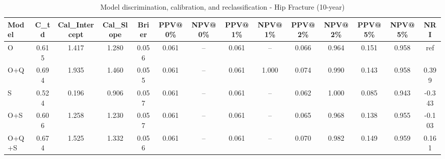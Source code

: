 \begin{table}[htbp]
\centering
\small
\caption{Model discrimination, calibration, and reclassification - Hip Fracture (10-year)}
\label{tab:perf_pd_10y}
\begin{tabular}{lccccccccccccc}
\toprule
Model & C\_td & Cal\_Intercept & Cal\_Slope & Brier & PPV@0\% & NPV@0\% & PPV@1\% & NPV@1\% & PPV@2\% & NPV@2\% & PPV@5\% & NPV@5\% & NRI \\
\midrule
O & 0.615 & 1.417 & 1.280 & 0.056 & 0.061 & -- & 0.061 & -- & 0.066 & 0.964 & 0.151 & 0.958 & ref \\
O+Q & 0.694 & 1.935 & 1.460 & 0.055 & 0.061 & -- & 0.061 & 1.000 & 0.074 & 0.990 & 0.143 & 0.958 & 0.399 \\
S & 0.524 & 0.196 & 0.906 & 0.057 & 0.061 & -- & 0.061 & -- & 0.062 & 1.000 & 0.085 & 0.943 & -0.343 \\
O+S & 0.606 & 1.258 & 1.230 & 0.057 & 0.061 & -- & 0.061 & -- & 0.065 & 0.968 & 0.138 & 0.955 & -0.103 \\
O+Q+S & 0.674 & 1.525 & 1.332 & 0.056 & 0.061 & -- & 0.061 & -- & 0.070 & 0.982 & 0.149 & 0.959 & 0.161 \\
\bottomrule
\end{tabular}
\end{table}